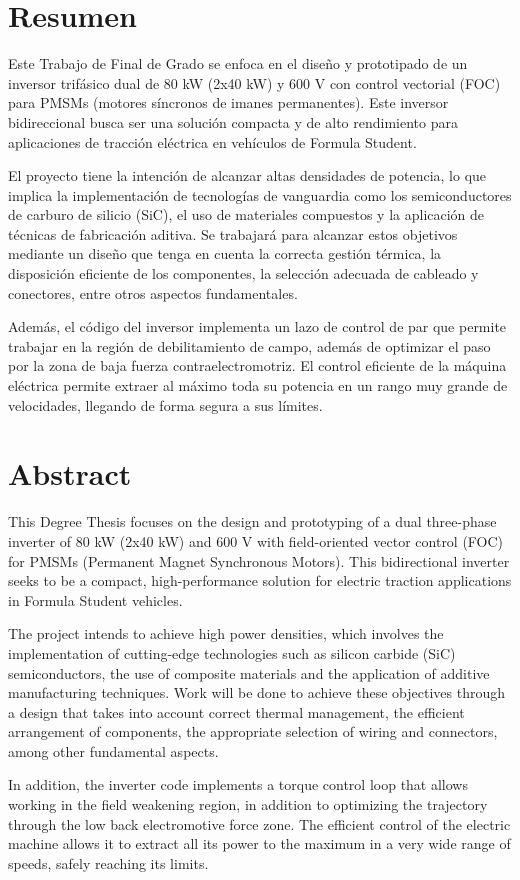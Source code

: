 \chapter*{Resumen}
Este Trabajo de Final de Grado se enfoca en el diseño y prototipado de un inversor trifásico dual de 80 kW (2x40 kW) y 600 V con control vectorial (FOC) para PMSMs (motores síncronos de imanes permanentes). Este inversor bidireccional busca ser una solución compacta y de alto rendimiento para aplicaciones de tracción eléctrica en vehículos de Formula Student.

El proyecto tiene la intención de alcanzar altas densidades de potencia, lo que implica la implementación de tecnologías de vanguardia como los semiconductores de carburo de silicio (SiC), el uso de materiales compuestos y la aplicación de técnicas de fabricación aditiva. Se trabajará para alcanzar estos objetivos mediante un diseño que tenga en cuenta la correcta gestión térmica, la disposición eficiente de los componentes, la selección adecuada de cableado y conectores, entre otros aspectos fundamentales.

Además, el código del inversor implementa un lazo de control de par que permite trabajar en la región de debilitamiento de campo, además de optimizar el paso por la zona de baja fuerza contraelectromotriz. El control eficiente de la máquina eléctrica permite extraer al máximo toda su potencia en un rango muy grande de velocidades, llegando de forma segura a sus límites.

\chapter*{Abstract}
This Degree Thesis focuses on the design and prototyping of a dual three-phase inverter of 80 kW (2x40 kW) and 600 V with field-oriented vector control (FOC) for PMSMs (Permanent Magnet Synchronous Motors). This bidirectional inverter seeks to be a compact, high-performance solution for electric traction applications in Formula Student vehicles.

The project intends to achieve high power densities, which involves the implementation of cutting-edge technologies such as silicon carbide (SiC) semiconductors, the use of composite materials and the application of additive manufacturing techniques. Work will be done to achieve these objectives through a design that takes into account correct thermal management, the efficient arrangement of components, the appropriate selection of wiring and connectors, among other fundamental aspects.

In addition, the inverter code implements a torque control loop that allows working in the field weakening region, in addition to optimizing the trajectory through the low back electromotive force zone. The efficient control of the electric machine allows it to extract all its power to the maximum in a very wide range of speeds, safely reaching its limits.